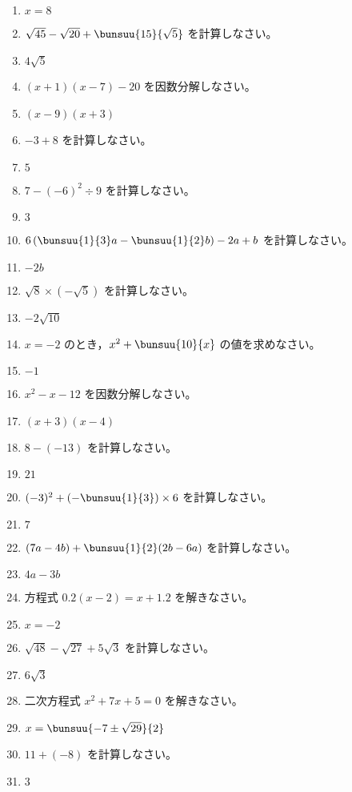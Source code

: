 \documentclass[uplatex,a4j,11pt]{jsreport}
\begin{document}
\begin{multicols}{2}
\begin{enumerate}
    \item $x=8$
    \item $\sqrt{45}-\sqrt{20}+\bunsuu{15}{\sqrt{5}}$ を計算しなさい。%
    \item $4\sqrt{5}$
    \item $(x+1)(x-7)-20$ を因数分解しなさい。%
    \item $(x-9)(x+3)$
    \item $-3+8$ を計算しなさい。%
    \item $5$
    \item $7-(-6)^2\div9$ を計算しなさい。%
    \item $3$
    \item $6\left(\bunsuu{1}{3}a-\bunsuu{1}{2}b\right)-2a+b$ を計算しなさい。%
    \item $-2b$
    \item $\sqrt{8}\times(-\sqrt{5})$ を計算しなさい。%
    \item $-2\sqrt{10}$
    \item $x=-2$ のとき，$x^2+\bunsuu{10}{x}$ の値を求めなさい。%
    \item $-1$
    \item $x^2-x-12$ を因数分解しなさい。%
    \item $(x+3)(x-4)$
    \item $8-(-13)$ を計算しなさい。%
    \item $21$
    \item $(-3)^2+\left(-\bunsuu{1}{3}\right)\times6$ を計算しなさい。%
    \item $7$
    \item $(7a-4b)+\bunsuu{1}{2}(2b-6a)$ を計算しなさい。%
    \item $4a-3b$
    \item 方程式 $0.2(x-2)=x+1.2$ を解きなさい。%
    \item $x = -2$
    \item $\sqrt{48}-\sqrt{27}+5\sqrt{3}$ を計算しなさい。%
    \item $6\sqrt{3}$
    \item 二次方程式 $x^2+7x+5=0$ を解きなさい。%
    \item $x=\bunsuu{-7\pm\sqrt{29}}{2}$
    \item $11+(-8)$ を計算しなさい。%
    \item $3$

\end{enumerate}
\end{multicols}
\end{document}

